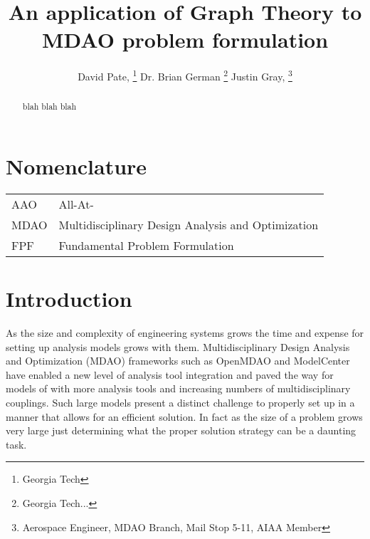 \documentclass[]{aiaa-tc} %
\title{An application of Graph Theory to MDAO problem formulation}
\author{
  David Pate, %
     \thanks{Georgia Tech}
  Dr. Brian German 
     \thanks{Georgia Tech...}
  Justin Gray,%
     \thanks{Aerospace Engineer, MDAO Branch, Mail Stop 5-11, AIAA Member}   
 }
\begin{document}
\maketitle
 
\begin{abstract}
   blah blah blah
\end{abstract}

\section*{Nomenclature}

\begin{tabular}{l l} 
    AAO      & All-At- \\
    MDAO     & Multidisciplinary Design Analysis and Optimization \\
    FPF      & Fundamental Problem Formulation \\
\end{tabular}


\section{Introduction}
    
    As the size and complexity of engineering systems grows the time and expense for setting up 
    analysis models grows with them. Multidisciplinary Design Analysis and Optimization (MDAO)
    frameworks such as OpenMDAO\cite{Gray2012} and ModelCenter have enabled a new level of analysis tool integration 
    and paved the way for models of with more analysis tools and increasing numbers of multidisciplinary couplings. 
    Such large models present a distinct challenge to properly set up in a manner that allows for an efficient solution. 
    In fact as the size of a problem grows very large just determining what the proper solution strategy can be a daunting 
    task. 
\end{document}
